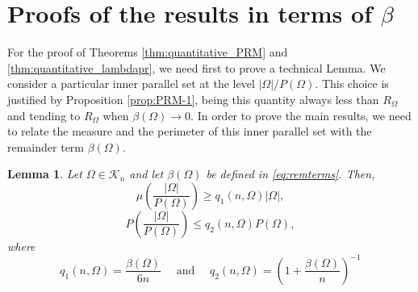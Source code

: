 \documentclass[oneside,a4paper,11pt,notitlepage]{article}
\newcommand{\abs}[1]{{\left|#1\right|}}
\theoremstyle{definition}
\theoremstyle{plain}
\newtheorem{lemma}[teorema]{Lemma}
\theoremstyle{definition}
\begin{document}
\section[Proofs of the results in terms of beta]{Proofs of the results in terms of $\beta$}
For the proof of Theorems \ref{thm:quantitative_PRM} and \ref{thm:quantitative_lambdapr}, we need first to prove a technical Lemma. We consider a particular inner parallel set at the level $\abs{\Omega}/P(\Omega)$. This choice is justified by Proposition \ref{prop:PRM-1}, being this quantity  always less than $R_\Omega$ and tending to $R_\Omega$ when $\beta(\Omega)\to 0$. In order to prove the main results, we need to relate the measure and the perimeter of this inner parallel set  with the remainder term $\beta(\Omega)$. 
\begin{lemma}\label{lemma:M(PM)eP(MP)}
Let $\Omega\in \mathcal{K}_n$ and let $\beta(\Omega)$ be defined in \eqref{eq:remterms}. Then,
    \begin{equation}
        \label{eq:lemmaM(mp)}\mu\left(\frac{\abs{\Omega}}{P(\Omega)}\right)\ge q_1(n,\Omega) \abs{\Omega},
    \end{equation}
\begin{equation}\label{eq:LemmaP(MP)}
        P\left(\frac{\abs{\Omega}}{P(\Omega)}\right)\le q_{2}(n,\Omega)P(\Omega),
    \end{equation}
    where
    \begin{equation}
        q_1(n,\Omega)= \frac{\beta(\Omega)}{6n}%
        \quad \text{ and }\quad q_{2}(n,\Omega)= \left(1+\frac{\beta(\Omega)}{n}\right)^{-1}%
    \end{equation}
  
\end{lemma}
\end{document}
